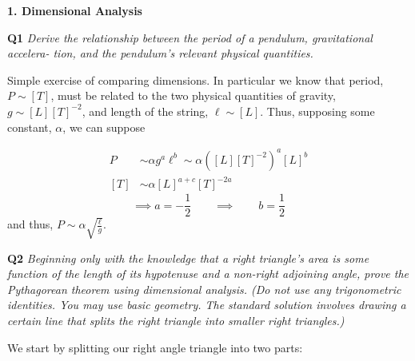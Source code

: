 \documentclass[10pt]{article}
\begin{document}
\textbf{\Large 1. Dimensional Analysis}

\textbf{Q1} \textit{Derive the relationship between the period of a pendulum, gravitational accelera-
tion, and the pendulum’s relevant physical quantities.}

Simple exercise of comparing dimensions. In particular we know that period, $P \sim [T]$, must be related to the two physical quantities of gravity, $g \sim [L][T]^{-2}$, and length of the string, $\ell \sim [L]$. Thus, supposing some constant, $\alpha$, we can suppose

\begin{align*}
  P & \sim \alpha g^{a}\ell^{b} \sim \alpha\left([L][T]^{-2}\right)^{a}[L]^{b} \\
  [T] & \sim \alpha [L]^{a + c}[T]^{-2a} 
\end{align*}
\[
\implies a = -\frac{1}{2} \hspace{2em} \implies \hspace{2em} b = \frac{1}{2}
\]
and thus, $P \sim \alpha\sqrt{\frac{\ell}{g}}$.

\textbf{Q2} \textit{Beginning only with the knowledge that a right triangle’s area is some function of
the length of its hypotenuse and a non-right adjoining angle, prove the Pythagorean
theorem using dimensional analysis. (Do not use any trigonometric identities. You
may use basic geometry. The standard solution involves drawing a certain line that
splits the right triangle into smaller right triangles.)}

We start by splitting our right angle triangle into two parts:

\begin{center}
\end{center}
\end{document}
